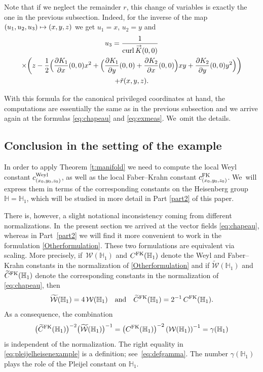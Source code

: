 \documentclass[JEP,XML,SOM,Unicode,published]{cedram}
\newcommand\mto{\mathchoice{\longmapsto}{\mapsto}{\mapsto}{\mapsto}}
\newcommand{\FK}{\textup{FK}}
\newcommand{\Weyl}{\textup{Weyl}}
\DeclareMathOperator{\curl}{curl}
\renewcommand{\vec}[1]
{\overset{\,{\raisebox{-2pt}{$\scriptstyle\to$}}}{#1}}
\theoremstyle{definition}
\newcommand{\1}{\mathbbm{1}}
\begin{document}
Note that if we neglect the remainder $r$, this change of variables is exactly the one in the previous subsection. Indeed, for the inverse of the map $(u_1,u_2,u_3)\mto (x,y,z)$ we get $u_1=x$, $u_2=y$ and
\begin{multline*}
u_3 = \frac{1}{\curl \vec K (0,0)}\\
\times\biggl(z - \frac12 \Bigl(\frac{\partial K_1}{\partial x}(0,0) x^2+ \Bigl(\frac{\partial K_1}{\partial y}(0,0) + \frac{\partial K_2}{\partial x}(0,0) \Bigr) xy
+ \frac{\partial K_2}{\partial y}(0,0) y^2\Bigr) \biggr) \\
+ \tilde r(x,y,z).
\end{multline*}

With this formula for the canonical privileged coordinates at hand, the computations are essentially the same as in the previous subsection and we arrive again at the formulas \eqref{eq:chapeau} and \eqref{eq:exmeas}. We~omit the details.

\subsection{Conclusion in the setting of the example}\label{sec:exampleconclusion}
In order to apply Theorem \ref{t:manifold} we need to compute the local Weyl constant $c^\Weyl_{(x_0,y_0,z_0)}$, as well as the local Faber--Krahn constant $c_{(x_0,y_0,z_0)}^\FK$. We~will express them in terms of the corresponding constants on the Heisenberg group $\mathbb H = \mathbb H_1$, which will be studied in more detail in Part \ref{part2} of this paper.

There is, however, a slight notational inconsistency coming from different normalizations. In~the present section we arrived at the vector fields \eqref{eq:chapeau}, whereas in Part~\ref{part2} we will find it more convenient to work in the formulation \eqref{Otherformulation}. These two formulations are equivalent via scaling. More precisely, if~$\mathcal W(\mathbb H_1)$ and $C^\FK(\mathbb H_1)$ denote the Weyl and Faber--Krahn constants in the normalization of \eqref{Otherformulation} and if
$\widetilde{\mathcal W}(\mathbb H_1)$ and $\widetilde C^\FK(\mathbb H_1)$ denote the corresponding constants in the normalization of \eqref{eq:chapeau}, then
\[
\widetilde{\mathcal W}(\mathbb H_1) = 4\,\mathcal W(\mathbb H_1)
\quad\text{and}\quad
\widetilde C^\FK(\mathbb H_1) = 2^{-1}\,C^\FK(\mathbb H_1).
\]
As a consequence, the combination
\begin{equation}
\label{eq:pleijelheisenexample}
\bigl(\widetilde C^\FK(\mathbb H_1)\bigr)^{-2} \bigl(\widetilde{\mathcal W}(\mathbb H_1)\bigr)^{-1} = \left(C^\FK(\mathbb H_1)\right)^{-2} \left(\mathcal W(\mathbb H_1)\right)^{-1} = \gamma(\mathbb H_1)
\end{equation}
is independent of the normalization. The right equality in \eqref{eq:pleijelheisenexample} is a definition; see~\eqref{eq:defgamma}. The number $\gamma(\mathbb H_1)$ plays the role of the Pleijel constant on $\mathbb H_1$.
\end{document}
